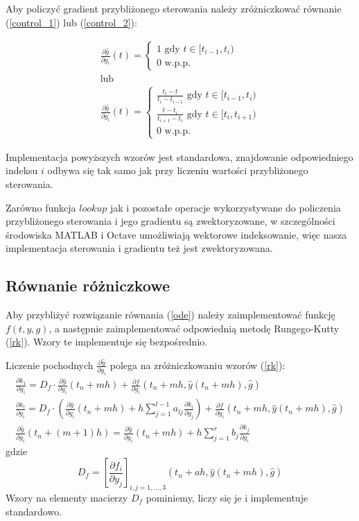 \documentclass[11pt]{article}
\begin{document}
Aby policzyć gradient przybliżonego sterowania należy zróżniczkować równanie (\ref{control_1}) lub (\ref{control_2}):

\begin{gather}
  \frac{\partial \hat{g}}{\partial g_i}(t) = \begin{cases} 1 \text{ gdy } t \in [t_{i-1}, t_i) \\ 0 \text{ w.p.p.} \end{cases} \label{dcontrol_1}\\
  \nonumber \text{lub}\\
  \frac{\partial \hat{g}}{\partial g_i}(t) = \begin{cases} \frac{t_i - t}{t_i - t_{i-1}} \text{ gdy } t \in [t_{i-1}, t_i) \\ \frac{t - t_i}{t_{i+1} - t_i} \text{ gdy } t \in [t_{i}, t_{i+1}) \\ 0 \text{ w.p.p.} \end{cases} \label{dcontrol_2}
\end{gather}

Implementacja powyższych wzorów jest standardowa, znajdowanie odpowiedniego indeksu $i$ odbywa się tak samo jak przy liczeniu wartości przybliżonego sterowania.

Zarówno funkcja $lookup$ jak i pozostałe operacje wykorzystywane do policzenia przybliżonego sterowania i jego gradientu są zwektoryzowane, w szczególności środowiska MATLAB i Octave umożliwiają wektorowe indeksowanie, więc nasza implementacja sterowania i gradientu też jest zwektoryzowana.

\subsection{Równanie różniczkowe}
Aby przybliżyć rozwiązanie równania (\ref{ode}) należy zaimplementować funkcję $f(t,y,g)$, a następnie zaimplementować odpowiednią metodę Rungego-Kutty (\ref{rk}). Wzory te implementuje się bezpośrednio.

Liczenie pochodnych $\frac{\partial \hat{y}}{\partial g_i}$ polega na zróżniczkowaniu wzorów (\ref{rk}):
\begin{gather}
    \frac{\partial k_1}{\partial g_i} = D_f \cdot \frac{\partial \hat{y}}{\partial g_i}(t_n + mh) + \frac{\partial f}{\partial g_i}(t_n + mh, \hat{y}(t_n + mh), \hat{g}) \nonumber \\
    \frac{\partial k_l}{\partial g_i}  = D_f \cdot \left(\frac{\partial \hat{y}}{\partial g_i}(t_n + mh) + h\sum_{j=1}^{l-1} a_{lj}\frac{\partial k_i}{\partial g_j} \right) + \frac{\partial f}{\partial g_i}(t_n + mh, \hat{y}(t_n + mh), \hat{g})  \label{drk}\\
    \frac{\partial \hat{y}}{\partial g_i}(t_n + (m+1)h) = \frac{\partial \hat{y}}{\partial g_i}(t_n + mh) + h\sum_{j=1}^r b_j \frac{\partial k_j}{\partial g_i} \nonumber
\end{gather}
gdzie
\begin{equation} \label{Df}
  D_f = {\left[\frac{\partial f_i}{\partial y_j}\right]}_{i,j = 1,\ldots, 3} (t_n + ah, \hat{y}(t_n + mh), \hat{g})
\end{equation}
Wzory na elementy macierzy $D_f$ pominiemy, liczy się je i implementuje standardowo.
\end{document}
